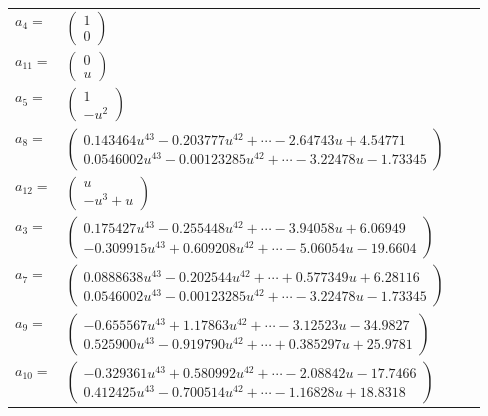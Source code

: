 \documentclass[1p]{elsarticle_modified}
\theoremstyle{definition}
\begin{document}
\begin{tabular}{m{7pt} m{180pt} m{7pt} m{180pt} }
\flushright $a_{4}=$&$\begin{pmatrix}1\\0\end{pmatrix}$ \\
\flushright $a_{11}=$&$\begin{pmatrix}0\\u\end{pmatrix}$ \\
\flushright $a_{5}=$&$\begin{pmatrix}1\\- u^2\end{pmatrix}$ \\
\flushright $a_{8}=$&$\begin{pmatrix}0.143464 u^{43}-0.203777 u^{42}+\cdots-2.64743 u+4.54771\\0.0546002 u^{43}-0.00123285 u^{42}+\cdots-3.22478 u-1.73345\end{pmatrix}$ \\
\flushright $a_{12}=$&$\begin{pmatrix}u\\- u^3+u\end{pmatrix}$ \\
\flushright $a_{3}=$&$\begin{pmatrix}0.175427 u^{43}-0.255448 u^{42}+\cdots-3.94058 u+6.06949\\-0.309915 u^{43}+0.609208 u^{42}+\cdots-5.06054 u-19.6604\end{pmatrix}$ \\
\flushright $a_{7}=$&$\begin{pmatrix}0.0888638 u^{43}-0.202544 u^{42}+\cdots+0.577349 u+6.28116\\0.0546002 u^{43}-0.00123285 u^{42}+\cdots-3.22478 u-1.73345\end{pmatrix}$ \\
\flushright $a_{9}=$&$\begin{pmatrix}-0.655567 u^{43}+1.17863 u^{42}+\cdots-3.12523 u-34.9827\\0.525900 u^{43}-0.919790 u^{42}+\cdots+0.385297 u+25.9781\end{pmatrix}$ \\
\flushright $a_{10}=$&$\begin{pmatrix}-0.329361 u^{43}+0.580992 u^{42}+\cdots-2.08842 u-17.7466\\0.412425 u^{43}-0.700514 u^{42}+\cdots-1.16828 u+18.8318\end{pmatrix}$ \\

\end{tabular}
\end{document}
